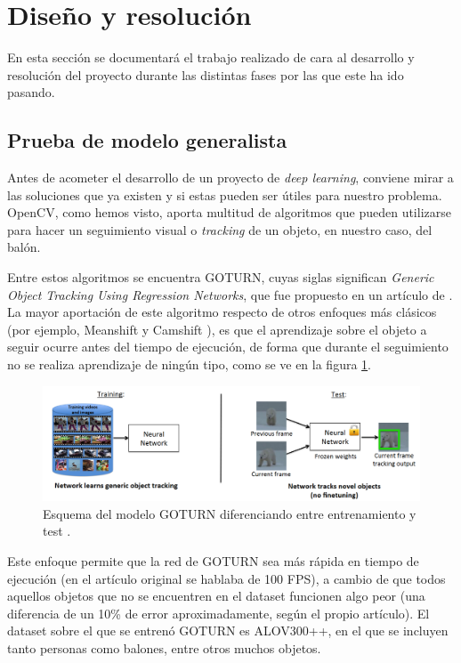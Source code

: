 \section{Diseño y resolución}

En esta sección se documentará el trabajo realizado de cara al desarrollo y resolución del proyecto durante las distintas fases por las que este ha ido pasando.

\subsection{Prueba de modelo generalista}

Antes de acometer el desarrollo de un proyecto de \textit{deep learning}, conviene mirar a las soluciones que ya existen y si estas pueden ser útiles para nuestro problema. OpenCV, como hemos visto, aporta multitud de algoritmos que pueden utilizarse para hacer un seguimiento visual o \textit{tracking} de un objeto, en nuestro caso, del balón.

Entre estos algoritmos se encuentra GOTURN, cuyas siglas significan \textit{Generic Object Tracking Using Regression Networks}, que fue propuesto en un artículo de \citet{art:goturn}. La mayor aportación de este algoritmo respecto de otros enfoques más clásicos (por ejemplo, Meanshift \cite{meanshift} y Camshift \cite{camshift}), es que el aprendizaje sobre el objeto a seguir ocurre antes del tiempo de ejecución, de forma que durante el seguimiento no se realiza aprendizaje de ningún tipo, como se ve en la figura \ref{fig:goturn1}.

\begin{figure}[H]
  \centering
  \includegraphics[width=\textwidth]{images/goturn}
  \caption{Esquema del modelo GOTURN diferenciando entre entrenamiento y test \cite{art:goturn}.}
  \label{fig:goturn1}
\end{figure}

Este enfoque permite que la red de GOTURN sea más rápida en tiempo de ejecución (en el artículo original se hablaba de 100 FPS), a cambio de que todos aquellos objetos que no se encuentren en el dataset funcionen algo peor (una diferencia de un 10\% de error aproximadamente, según el propio artículo). El dataset sobre el que se entrenó GOTURN es ALOV300++, en el que se incluyen tanto personas como balones, entre otros muchos objetos.

